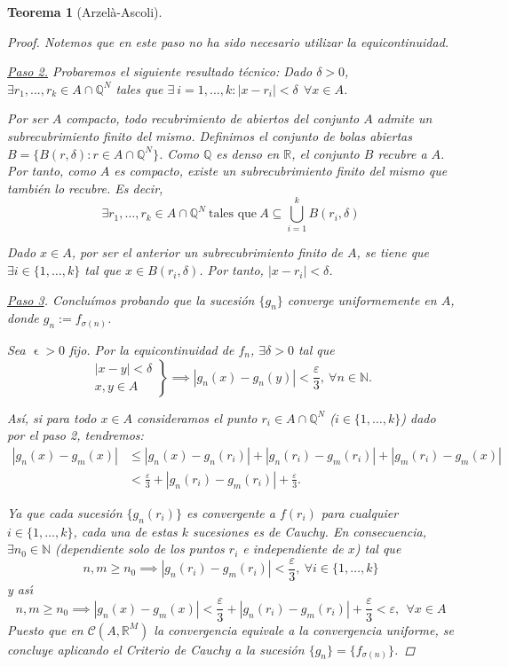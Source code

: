 \documentclass[11pt, a4paper]{article}
\let\epsilon\upvarepsilon
\theoremstyle{theorem-style}
\newtheorem{nth}{Teorema}[section]
\theoremstyle{definition-style}
\theoremstyle{remark-style}
\theoremstyle{example-style}
\begin{document}
\begin{nth}[Arzelà-Ascoli]
\begin{proof}
Notemos que en este paso no ha sido necesario utilizar la equicontinuidad.

\underline{Paso 2.} Probaremos el siguiente resultado técnico: Dado $\delta>0$, $\exists r_1,...,r_k \in A \cap \mathbb Q^N$ tales que $\exists \ i=1,...,k : |x-r_i| < \delta \ \ \forall x \in A$.

Por ser $A$ compacto, todo recubrimiento de abiertos del conjunto $A$ admite un subrecubrimiento finito del mismo. Definimos el conjunto de bolas abiertas $B=\{B(r,\delta) : r \in A\cap \mathbb Q^N \}$. Como $\mathbb{Q}$ es denso en $\mathbb{R}$, el conjunto $B$ recubre a $A$. Por tanto, como $A$ es compacto, existe un subrecubrimiento finito del mismo que también lo recubre. Es decir, $$\exists r_1,\dots, r_k \in A\cap \mathbb Q^N \ \text{tales que} \ A \subseteq \bigcup_{i=1}^k B(r_i,\delta)$$
 
Dado $x \in A$, por ser el anterior un subrecubrimiento finito de $A$, se tiene que\\ $\exists i \in \{1,\dots,k\}$ tal que $x \in B(r_i,\delta)$. Por tanto, $|x-r_i| <\delta$.

\underline{Paso 3}. Concluímos probando que la sucesión $\{g_n\}$ converge uniformemente en $A$, donde $g_n := f_{\sigma(n)}$.

Sea $\epsilon>0$ fijo. Por la equicontinuidad de $f_n$, 
$\exists\delta>0$ tal que
\[
\left.
\begin{array}{c}
|x-y| <\delta
\\
x,y\in A
\end{array}
\right\}
 \implies |g_n(x)-g_n(y)|<\frac{\varepsilon}{3} , \ \forall n\in\mathbb N.
\]

Así, si para todo $x\in A$ consideramos el punto  $r_i\in A\cap \mathbb Q^N$ ($i \in \{1,\dots,k\}$) dado por el paso 2, tendremos:
\[
\begin{aligned}
|g_n(x)-g_m(x)| &\leq |g_n(x)-g_n(r_i)| + |g_n(r_i)-g_m(r_i)|+|g_m(r_i)-g_m(x)|
		\\
		&<\frac{\varepsilon}{3} +|g_n(r_i)-g_m(r_i)| 
+ \frac{\varepsilon}{3} .
\end{aligned}
\]



Ya que cada sucesi\'on $\{ g_n(r_i)\}$ es convergente a $f(r_i)$ para cualquier $i\in \{ 1,\dots ,k\}$, cada una de estas $k$ sucesiones  es de Cauchy. En consecuencia, $\exists n_0\in\mathbb N$ ({dependiente solo de los puntos $r_i$ e independiente de $x$}) tal que
\[
n,m\geq n_0 \implies |g_n(r_i)-g_m(r_i)| <\frac{\varepsilon}{3} , \ \forall i\in \{ 1,\dots ,k\}
\]
y as\'{\i}
\[
n,m\geq n_0 \implies |g_n(x)-g_m(x)| <\frac{\varepsilon}{3} +|g_n(r_i)-g_m(r_i)| 
+ \frac{\varepsilon}{3} <\varepsilon , \ \ \forall x\in A
\]
Puesto que en $\mathcal{C}(A,\mathbb R^M )$ la convergencia equivale a la convergencia uniforme, se concluye aplicando el \textit{Criterio de Cauchy} a la sucesión $\{g_n\} = \{f_{\sigma(n)}\}$.
\end{proof}
	
\end{nth}
\end{document}
